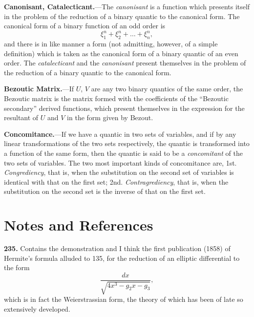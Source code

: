 \documentclass[12pt,a4paper]{article}
\theoremstyle{definition}
\begin{document}
\vspace{1em}

\noindent\textbf{Canonisant, Catalecticant.}---The \textit{canonisant} is a function which presents itself in the problem of the reduction of a binary quantic to the canonical form. The canonical form of a binary function of an odd order is
\[
\xi_1^n + \xi_2^n + \ldots + \xi_n^n,
\]
and there is in like manner a form (not admitting, however, of a simple definition) which is taken as the canonical form of a binary quantic of an even order. The \textit{catalecticant} and the \textit{canonisant} present themselves in the problem of the reduction of a binary quantic to the canonical form.

\vspace{1em}

\noindent\textbf{Bezoutic Matrix.}---If $U$, $V$ are any two binary quantics of the same order, the Bezoutic matrix is the matrix formed with the coefficients of the ``Bezoutic secondary'' derived functions, which present themselves in the expression for the resultant of $U$ and $V$ in the form given by Bezout.

\vspace{1em}

\noindent\textbf{Concomitance.}---If we have a quantic in two sets of variables, and if by any linear transformations of the two sets respectively, the quantic is transformed into a function of the same form, then the quantic is said to be a \textit{concomitant} of the two sets of variables. The two most important kinds of concomitance are, 1st. \textit{Congrediency}, that is, when the substitution on the second set of variables is identical with that on the first set; 2nd. \textit{Contragrediency}, that is, when the substitution on the second set is the inverse of that on the first set.

\newpage


\section*{Notes and References}

\noindent\textbf{235.} Contains the demonstration and I think the first publication (1858) of Hermite's formula alluded to 135, for the reduction of an elliptic differential to the form
\[
\frac{dx}{\sqrt{4x^3 - g_2 x - g_3}},
\]
which is in fact the Weierstrassian form, the theory of which has been of late so extensively developed.
\end{document}
